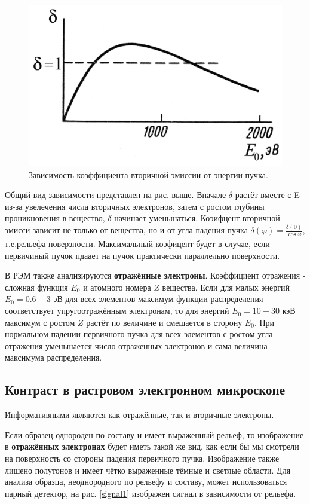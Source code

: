\documentclass[a4paper]{article}
\begin{document}
\begin{figure}[H]
    \centering
    \includegraphics[scale = 0.2]{delta.png}
    \caption{Зависимость коэффициента вторичной эмиссии от энергии пучка.}
    \label{beta}
\end{figure}

Общий вид зависимости представлен на рис. выше. Вначале $\delta$ растёт вместе с E из-за увелечения числа вторичных электронов, затем с ростом глубины проникновения в вещество, 
$\delta$ начинает уменьшаться. Коэифцент вторичной эмисси зависит не только от вещества, но и от угла падения пучка $\delta (\varphi) = \frac{\delta(0)}{\cos \varphi}$, т.е.рельефа поверзности. Максимальный коэфицент будет в 
случае, если первичиный пучок пдаает на пучок практически параллельно поверхности.

В РЭМ также анализируются \textbf{отражённые электроны}. Коэффициент отражения - сложная функция $E_0$ и атомного номера $Z$ вещества. Если для малых энергий 
$E_0 = 0.6 - 3$ эВ для всех элементов максимум функции распределения соответствует упругоотражённым электронам, то для энергий $E_0 = 10 - 30$ кэВ максимум с ростом 
$Z$ растёт по величине и смещается в сторону $E_0$. При нормальном падении первичного пучка для всех элементов с ростом угла отражения уменьшается число отраженных 
электронов и сама величина максимума распределения.

\subsection{Контраст в растровом электронном микроскопе}

Информативными являются как отражённые, так и вторичные электроны. \par
Если образец однороден по составу и имеет выраженный рельеф, то изображение в \textbf{отражённых электронах} будет иметь такой же вид, как если бы мы смотрели на 
поверхность со стороны падения первичного пучка. Изображение также лишено полутонов и имеет чётко выраженные тёмные и светлые области. Для анализа образца, неоднородного 
по рельефу и составу, может использоваться парный детектор, на рис. \ref{signal1} изображен сигнал в зависимости от рельефа. \par
\end{document}
